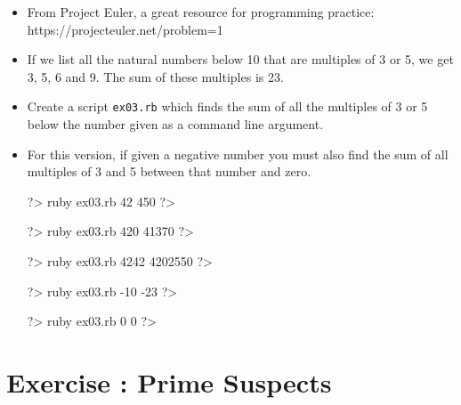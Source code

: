 \documentclass{42-en}
\begin{document}
\exnumber{\exercicenumber}


\begin{itemize}

\item From Project Euler, a great resource for programming practice:\\
https://projecteuler.net/problem=1
\item If we list all the natural numbers below 10 that are multiples of 3 or 5, we get 3, 5, 6 and 9. The sum of these multiples is 23.
\item Create a script \texttt{ex03.rb} which finds the sum of all the multiples of 3 or 5 below the number given as a command line argument.
\item For this version, if given a negative number you must also find the sum of all multiples of 3 and 5 between that number and zero.

\begin{42console}
	?> ruby ex03.rb 42
	450
	?>
\end{42console}

\begin{42console}
	?> ruby ex03.rb 420
	41370
	?>
\end{42console}

\begin{42console}
	?> ruby ex03.rb 4242
	4202550
	?>
\end{42console}

\begin{42console}
	?> ruby ex03.rb -10
	-23
	?>
\end{42console}

\begin{42console}
	?> ruby ex03.rb 0
	0
	?>
\end{42console}

\end{itemize}



\chapter{Exercise \exercicenumber: Prime Suspects}
\end{document}
